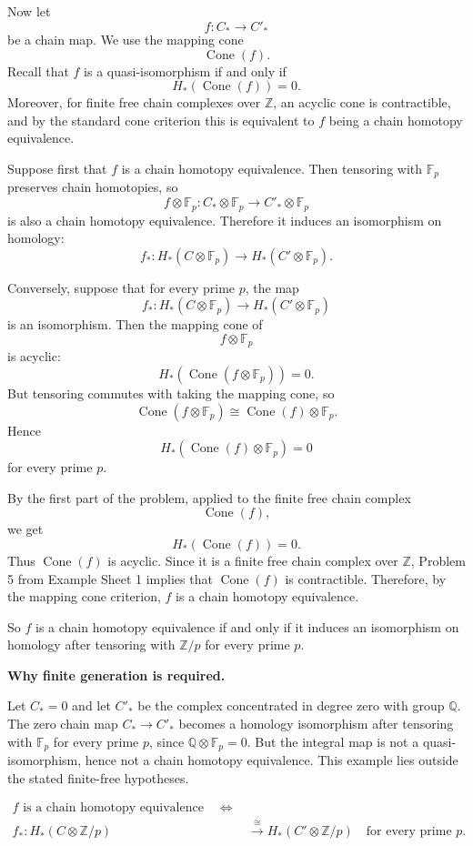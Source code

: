 \begin{solution}
Now let
\[
f:C_*\longrightarrow C'_*
\]
be a chain map. We use the mapping cone
\[
\operatorname{Cone}(f).
\]
Recall that \(f\) is a quasi-isomorphism if and only if
\[
H_*(\operatorname{Cone}(f))=0.
\]
Moreover, for finite free chain complexes over \(\mathbb Z\), an acyclic cone is contractible, and by the standard cone criterion this is equivalent to \(f\) being a chain homotopy equivalence.

Suppose first that \(f\) is a chain homotopy equivalence. Then tensoring with \(\mathbb F_p\) preserves chain homotopies, so
\[
f\otimes \mathbb F_p:C_*\otimes \mathbb F_p
\longrightarrow
C'_*\otimes \mathbb F_p
\]
is also a chain homotopy equivalence. Therefore it induces an isomorphism on homology:
\[
f_*:H_*(C\otimes \mathbb F_p)
\longrightarrow
H_*(C'\otimes \mathbb F_p).
\]

Conversely, suppose that for every prime \(p\), the map
\[
f_*:H_*(C\otimes \mathbb F_p)
\longrightarrow
H_*(C'\otimes \mathbb F_p)
\]
is an isomorphism. Then the mapping cone of
\[
f\otimes \mathbb F_p
\]
is acyclic:
\[
H_*(\operatorname{Cone}(f\otimes \mathbb F_p))=0.
\]
But tensoring commutes with taking the mapping cone, so
\[
\operatorname{Cone}(f\otimes \mathbb F_p)
\cong
\operatorname{Cone}(f)\otimes \mathbb F_p.
\]
Hence
\[
H_*(\operatorname{Cone}(f)\otimes \mathbb F_p)=0
\]
for every prime \(p\).

By the first part of the problem, applied to the finite free chain complex
\[
\operatorname{Cone}(f),
\]
we get
\[
H_*(\operatorname{Cone}(f))=0.
\]
Thus \(\operatorname{Cone}(f)\) is acyclic. Since it is a finite free chain complex over \(\mathbb Z\), Problem 5 from Example Sheet 1 implies that \(\operatorname{Cone}(f)\) is contractible. Therefore, by the mapping cone criterion, \(f\) is a chain homotopy equivalence.

So \(f\) is a chain homotopy equivalence if and only if it induces an isomorphism on homology after tensoring with \(\mathbb Z/p\) for every prime \(p\).

\medskip
\noindent\textbf{Why finite generation is required.}\par\smallskip
Let \(C_*=0\) and let \(C'_*\) be the complex concentrated in degree zero with group \(\mathbb Q\). The zero chain map \(C_*\to C'_*\) becomes a homology isomorphism after tensoring with \(\mathbb F_p\) for every prime \(p\), since \(\mathbb Q\otimes\mathbb F_p=0\). But the integral map is not a quasi-isomorphism, hence not a chain homotopy equivalence. This example lies outside the stated finite-free hypotheses.

\[
\begin{aligned}
f\text{ is a chain homotopy equivalence}
\quad\Longleftrightarrow\quad&
\\[-2mm]
f_*:H_*(C\otimes\mathbb Z/p)&\xrightarrow{\;\cong\;}
H_*(C'\otimes\mathbb Z/p)
\quad\text{for every prime }p .
\end{aligned}
\]
\end{solution}

